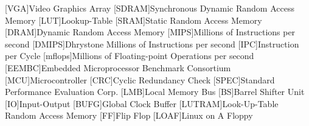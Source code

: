 \begin{acronym}[Bash]
  [VGA]{Video Graphics Array}
[SDRAM]{Synchronous Dynamic Random Access Memory}
 [LUT]{Lookup-Table}
 [SRAM]{Static Random Access Memory}
[DRAM]{Dynamic Random Access Memory}
 [MIPS]{Millions of Instructions per second}
[DMIPS]{Dhrystone Millions of Instructions per second}
 [IPC]{Instruction per Cycle}
[mflops]{Millions of Floating-point Operations per second}
[EEMBC]{Embedded Microprocessor Benchmark Consortium}
[MCU]{Microcontroller}
[CRC]{Cyclic Redundancy Check}
[SPEC]{Standard Performance Evaluation Corp.}
[LMB]{Local Memory Bus}
[BS]{Barrel Shifter Unit}
[IO]{Input-Output}
[BUFG]{Global Clock Buffer}
[LUTRAM]{Look-Up-Table Random Access Memory}
[FF]{Flip Flop}
[LOAF]{Linux on A Floppy}
\end{acronym}
